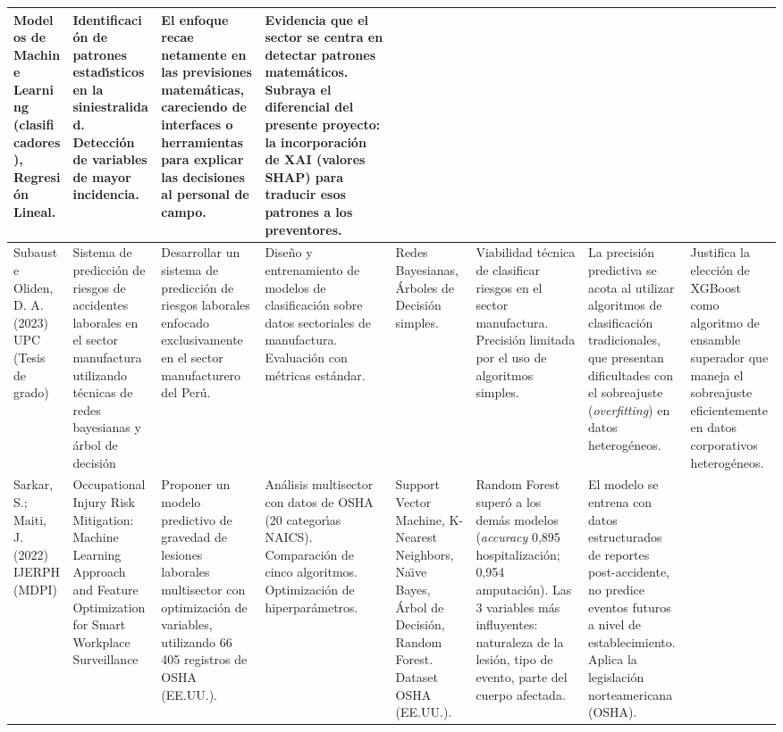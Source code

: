 \begin{landscape}
\begin{longtable}{@{}p{1.6cm}p{2.4cm}p{2.2cm}p{2.4cm}p{2cm}p{2.2cm}p{2.4cm}p{2.6cm}@{}}
		Modelos de Machine Learning (clasificadores), Regresi\'on Lineal. &
		Identificaci\'on de patrones estad\'{\i}sticos en la siniestralidad. Detecci\'on de variables de mayor incidencia. &
		El enfoque recae netamente en las previsiones matem\'aticas, careciendo de interfaces o herramientas para explicar las decisiones al personal de campo. &
		Evidencia que el sector se centra en detectar patrones matem\'aticos. Subraya el diferencial del presente proyecto: la incorporaci\'on de XAI (valores SHAP) para traducir esos patrones a los preventores. \\
		\hline
		Subauste Oliden, D. A. (2023) UPC (Tesis de grado) &
		Sistema de predicci\'on de riesgos de accidentes laborales en el sector manufactura utilizando t\'ecnicas de redes bayesianas y \'arbol de decisi\'on &
		Desarrollar un sistema de predicci\'on de riesgos laborales enfocado exclusivamente en el sector manufacturero del Per\'u. &
		Dise\~no y entrenamiento de modelos de clasificaci\'on sobre datos sectoriales de manufactura. Evaluaci\'on con m\'etricas est\'andar. &
		Redes Bayesianas, \'Arboles de Decisi\'on simples. &
		Viabilidad t\'ecnica de clasificar riesgos en el sector manufactura. Precisi\'on limitada por el uso de algoritmos simples. &
		La precisi\'on predictiva se acota al utilizar algoritmos de clasificaci\'on tradicionales, que presentan dificultades con el sobreajuste (\emph{overfitting}) en datos heterog\'eneos. &
		Justifica la elecci\'on de XGBoost como algoritmo de ensamble superador que maneja el sobreajuste eficientemente en datos corporativos heterog\'eneos. \\
		\hline
		Sarkar, S.; Maiti, J. (2022) IJERPH (MDPI) &
		Occupational Injury Risk Mitigation: Machine Learning Approach and Feature Optimization for Smart Workplace Surveillance &
		Proponer un modelo predictivo de gravedad de lesiones laborales multisector con optimizaci\'on de variables, utilizando 66\,405 registros de OSHA (EE.UU.). &
		An\'alisis multisector con datos de OSHA (20 categor\'{\i}as NAICS). Comparaci\'on de cinco algoritmos. Optimizaci\'on de hiperpar\'ametros. &
		Support Vector Machine, K-Nearest Neighbors, Na\"{\i}ve Bayes, \'Arbol de Decisi\'on, Random Forest. Dataset OSHA (EE.UU.). &
		Random Forest super\'o a los dem\'as modelos (\emph{accuracy} 0,895 hospitalizaci\'on; 0,954 amputaci\'on). Las 3 variables m\'as influyentes: naturaleza de la lesi\'on, tipo de evento, parte del cuerpo afectada. &
		El modelo se entrena con datos estructurados de reportes post-accidente, no predice eventos futuros a nivel de establecimiento. Aplica la legislaci\'on norteamericana (OSHA). &

\end{longtable}
\end{landscape}
